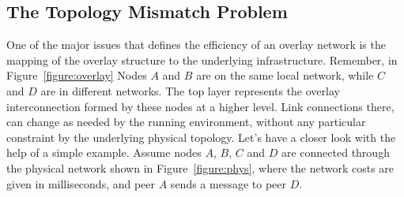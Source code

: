 %
%





\subsection{The Topology Mismatch Problem}

One of the major issues that defines the efficiency of an overlay network is the
mapping of the overlay structure to the underlying infrastructure. Remember, in
Figure~\ref{figure:overlay} Nodes $A$ and $B$ are on the same local network,
while $C$ and $D$ are in different networks. The top layer represents the
overlay interconnection formed by these nodes at a higher level. Link
connections there, can change as needed by the running environment, without any
particular constraint by the underlying physical topology. Let's have a closer
look with the help of a simple example. Assume nodes $A$, $B$, $C$ and $D$ are
connected through the physical network shown in Figure~\ref{figure:phys}, where
the network costs are given in milliseconds, and peer $A$ sends a message to
peer $D$.

